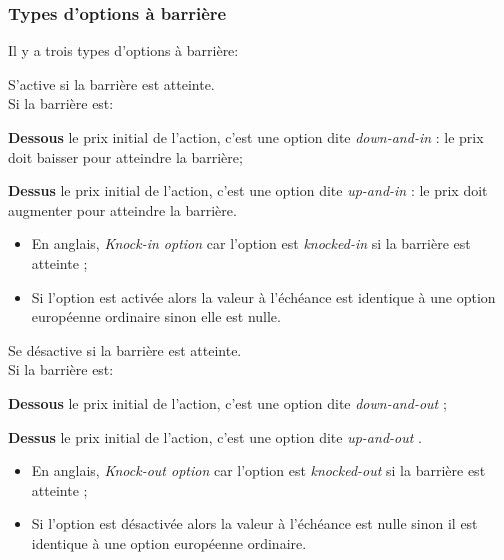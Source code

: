 \documentclass[10pt, french]{article}
\begin{document}
\begin{multicols*}{2}
\subsubsection*{Types d'options à barrière}

Il y a trois types d'options à barrière:
\begin{definitionNOHFILLsub}
S'active si la barrière est atteinte.\\

Si la barrière est:
\begin{description}
	\item	\textbf{Dessous} le prix initial de l'action, c'est une option dite \og \textit{down-and-in} \fg{}: le prix doit baisser pour atteindre la barrière;
	\item	\textbf{Dessus} le prix initial de l'action, c'est une option dite \og \textit{up-and-in} \fg{}: le prix doit augmenter pour atteindre la barrière.
\end{description}

\tcbline

\begin{itemize}[leftmargin = *]
\item	En anglais, \og \textit{Knock-in option} \fg{} car l'option est \og \textit{knocked-in} si la barrière est atteinte \fg{};
	\item	Si l'option est activée alors la valeur à l'échéance est identique à une option européenne ordinaire sinon elle est nulle.
\end{itemize}
\end{definitionNOHFILLsub}


\begin{definitionNOHFILLsub}
Se désactive si la barrière est atteinte.\\

Si la barrière est:
\begin{description}
	\item	\textbf{Dessous} le prix initial de l'action, c'est une option dite \og \textit{down-and-out} \fg{};
	\item	\textbf{Dessus} le prix initial de l'action, c'est une option dite \og \textit{up-and-out} \fg{}.
\end{description}

\tcbline

\begin{itemize}[leftmargin = *]
	\item	En anglais, \og \textit{Knock-out option} \fg{} car l'option est \og \textit{knocked-out} si la barrière est atteinte \fg{};
	\item	Si l'option est désactivée alors la valeur à l'échéance est nulle sinon il est identique  à une option européenne ordinaire.
\end{itemize}
\end{definitionNOHFILLsub}



\end{multicols*}
\end{document}
